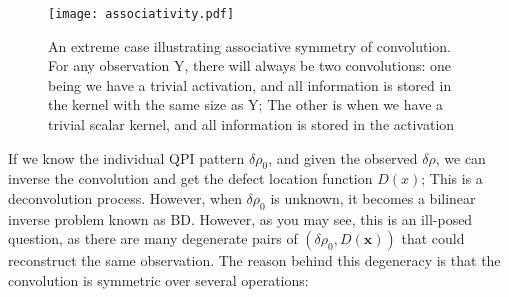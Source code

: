\begin{figure}
	\texttt{[image: associativity.pdf]} 
	\centering
	\caption{An extreme case illustrating associative symmetry of convolution. For any observation Y, there will always be two convolutions: one being we have a trivial activation, and all information is stored in the kernel with the same size as Y; The other is when we have a trivial scalar kernel, and all information is stored in the activation}
	\label{fig:ch6_assoc}
\end{figure}

\noindent If we know the individual QPI pattern $\delta\rho_0$, and given the observed $\delta\rho$, we can inverse the convolution and get the defect location function $D(x)$; This is a deconvolution process. However, when $\delta\rho_0$ is unknown, it becomes a bilinear inverse problem known as \ac{BD}. However, as you may see, this is an ill-posed question, as there are many degenerate pairs of $(\delta\rho_0, D(\mathbf{x}))$ that could reconstruct the same observation. The reason behind this degeneracy is that the convolution is symmetric over several operations: 
